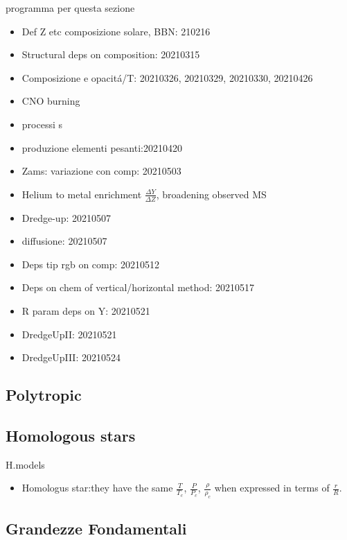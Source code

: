 \begin{frame}{programma per questa sezione}
    \begin{itemize}
        \item Def Z etc composizione solare, BBN: 210216
        \item Structural deps on composition: 20210315
        \item Composizione e opacit\'a/T: 20210326, 20210329, 20210330, 20210426
        \item CNO burning
        \item processi s
        \item produzione elementi pesanti:20210420
        \item Zams: variazione con comp: 20210503
        \item Helium to metal enrichment $\frac{\Delta Y}{\Delta Z}$, broadening observed MS
        \item Dredge-up: 20210507
        \item diffusione: 20210507
        \item Deps tip rgb on comp: 20210512
        \item Deps on chem of vertical/horizontal method: 20210517
        \item R param deps on Y: 20210521
        \item DredgeUpII: 20210521
        \item DredgeUpIII: 20210524
    \end{itemize}
\end{frame}

\subsection{Polytropic}

\subsection{Homologous stars}

\begin{frame}{H.models}
\begin{itemize}
    \item  Homologus star:they have the same $\frac{T}{T_c}$, $\frac{P}{P_c}$, $\frac{\rho}{\rho_c}$ when expressed in terms of $\frac{r}{R}$.
\end{itemize}
    
\end{frame}

\subsection{Grandezze Fondamentali}


